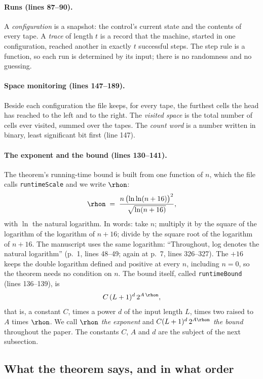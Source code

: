 \paragraph{Runs (lines 87--90).}
A \emph{configuration} is a snapshot: the control's current state and the contents of every tape. A \emph{trace} of length $t$ is a record that the machine, started in one configuration, reached another in exactly $t$ successful steps. The
step rule is a function, so each run is determined by its input; there
is no randomness and no guessing.

\paragraph{Space monitoring (lines 147--189).}
Beside each configuration the file keeps, for every tape, the furthest
cells the head has reached to the left and to the right. The
\emph{visited space} is the total number of cells ever visited, summed
over the tapes. The \emph{count word} is a number written in binary,
least significant bit first (line 147).

\paragraph{The exponent and the bound (lines 130--141).}
The theorem's running-time bound is built from one function of $n$,
which the file calls \texttt{runtimeScale} and we write $\rhon$:
\[
  \rhon \;=\; \frac{n\,\bigl(\ln\ln(n+16)\bigr)^2}{\sqrt{\ln(n+16)}},
\]
with $\ln$ the natural logarithm. In words: take $n$; multiply it by
the square of the logarithm of the logarithm of $n + 16$; divide by the
square root of the logarithm of $n + 16$. The manuscript uses the same
logarithm: ``Throughout, log denotes the natural logarithm'' (p.~1,
lines 48--49; again at p.~7, lines 326--327). The $+16$ keeps the double
logarithm defined and positive at every $n$, including $n = 0$, so the
theorem needs no condition on $n$. The bound itself, called
\texttt{runtimeBound} (lines 136--139), is
\[
  C\,(L+1)^d\,2^{A\,\rhon},
\]
that is, a constant $C$, times a power $d$ of the input length $L$,
times two raised to $A$ times $\rhon$. We call $\rhon$ \emph{the
exponent} and $C(L+1)^d\,2^{A\rhon}$ \emph{the bound} throughout the
paper. The constants $C$, $A$ and $d$ are the subject of the next
subsection.

\subsection{What the theorem says, and in what order}
\label{sec:statement-theorem}

